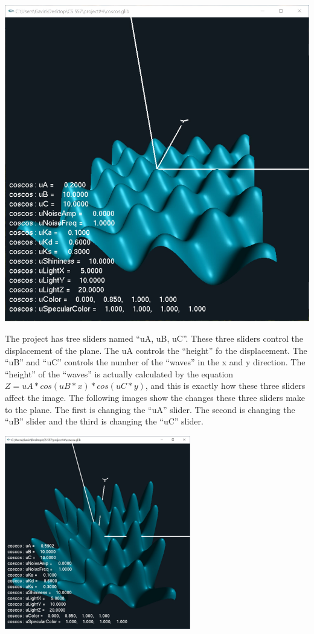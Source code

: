 \documentclass[letterpaper,14pt,titlepage,fleqn]{article}
\begin{document}
\begin{center}
	\includegraphics[width=5.5in]{lighting.jpg}
\end{center}
The project has tree sliders named ``uA, uB, uC''. These three sliders control the displacement of the plane. The uA controls the ``height'' fo the displacement. The ``uB'' and ``uC'' controls the number of the ``waves'' in the x and y direction. The ``height'' of the ``waves'' is actually calculated by the equation $Z = uA * cos(uB*x) * cos(uC*y)$, and this is exactly how these three sliders affect the image. The following images show the changes these three sliders make to the plane. The first is changing the ``uA'' slider. The second is changing the ``uB'' slider and the third is changing the ``uC'' slider.
\begin{center}
	\includegraphics[width=3.2in]{uA.jpg}
\end{center}
\end{document}
